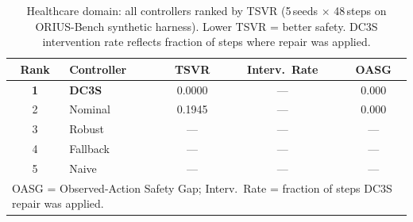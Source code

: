\begin{table}[htbp]
\centering\small
\caption{Healthcare domain: all controllers ranked by TSVR (5\,seeds $\times$ 48\,steps on ORIUS-Bench synthetic harness). Lower TSVR = better safety. DC3S intervention rate reflects fraction of steps where repair was applied.}
\label{tab:healthcare_leaderboard}
\begin{tabular}{clccc}
\toprule
\textbf{Rank} & \textbf{Controller} & \textbf{TSVR} & \textbf{Interv.\ Rate} & \textbf{OASG} \\
\midrule
\textbf{1} & \textbf{DC3S} & 0.0000 & --- & 0.000 \\
2 & Nominal & 0.1945 & --- & 0.000 \\
3 & Robust & --- & --- & --- \\
4 & Fallback & --- & --- & --- \\
5 & Naive & --- & --- & --- \\
\bottomrule
\multicolumn{5}{l}{\small OASG = Observed-Action Safety Gap; Interv.\ Rate = fraction of steps DC3S repair was applied.}\\
\end{tabular}
\end{table}